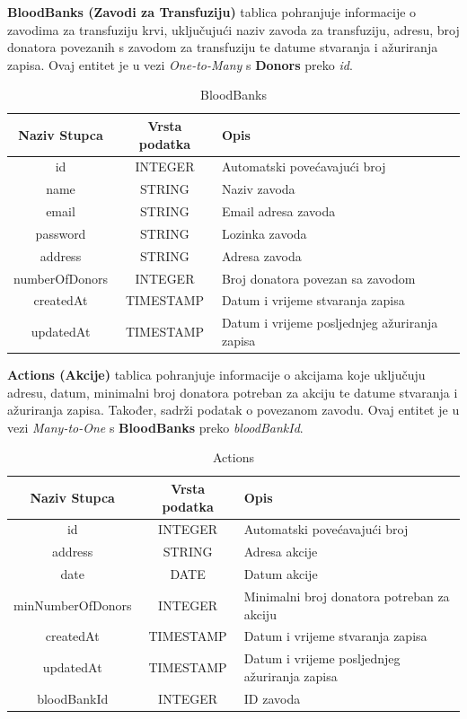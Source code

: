 \documentclass[12pt]{article}
\begin{document}
\noindent
\textbf{BloodBanks (Zavodi za Transfuziju)} tablica pohranjuje informacije o
zavodima za transfuziju krvi, uključujući naziv zavoda za transfuziju, adresu,
broj donatora povezanih s zavodom za transfuziju te datume stvaranja i ažuriranja
zapisa. Ovaj entitet je u vezi \textit{One-to-Many} s \textbf{Donors} preko
\textit{id}.
\begin{table}[H]
	\renewcommand{\arraystretch}{2}
	\centering
	\begin{tabularx}
		{1\textwidth}{|c|c|X|} \hline \textbf{Naziv Stupca} & \textbf{Vrsta
		podatka} & \textbf{Opis} \\ \hline \cellcolor{LightGreen} id & INTEGER &
		Automatski povećavajući broj \\ \hline name & STRING & Naziv zavoda \\
		\hline email & STRING & Email adresa zavoda \\ \hline password & STRING &
		Lozinka zavoda \\ \hline address & STRING & Adresa zavoda \\ \hline
		numberOfDonors & INTEGER & Broj donatora povezan sa zavodom \\ \hline
		createdAt & TIMESTAMP & Datum i vrijeme stvaranja zapisa \\ \hline
		updatedAt & TIMESTAMP & Datum i vrijeme posljednjeg ažuriranja zapisa \\
		\hline
	\end{tabularx}
	\caption{BloodBanks}
	\label{tab:my_label}
\end{table}
\clearpage %

\noindent
\textbf{Actions (Akcije)} tablica pohranjuje informacije o akcijama koje uključuju
adresu, datum, minimalni broj donatora potreban za akciju te datume stvaranja i
ažuriranja zapisa. Također, sadrži podatak o povezanom zavodu. Ovaj entitet je
u vezi \textit{Many-to-One} s \textbf{BloodBanks} preko \textit{bloodBankId}.
\begin{table}[H]
	\renewcommand{\arraystretch}{2}
	\centering
	\begin{tabularx}
		{1\textwidth}{|c|c|X|} \hline \textbf{Naziv Stupca} & \textbf{Vrsta
		podatka} & \textbf{Opis} \\ \hline \cellcolor{LightGreen}id & INTEGER & Automatski
		povećavajući broj \\ \hline address & STRING & Adresa akcije \\ \hline date
		  & DATE & Datum akcije \\ \hline minNumberOfDonors & INTEGER & Minimalni broj
		donatora potreban za akciju \\ \hline createdAt & TIMESTAMP & Datum i vrijeme
		stvaranja zapisa \\ \hline updatedAt & TIMESTAMP & Datum i vrijeme posljednjeg
		ažuriranja zapisa \\ \hline \cellcolor{LightBlue} bloodBankId & INTEGER &
		ID zavoda \\ \hline
	\end{tabularx}
	\caption{Actions}
	\label{tab:my_label}
\end{table}
\clearpage %
\end{document}
